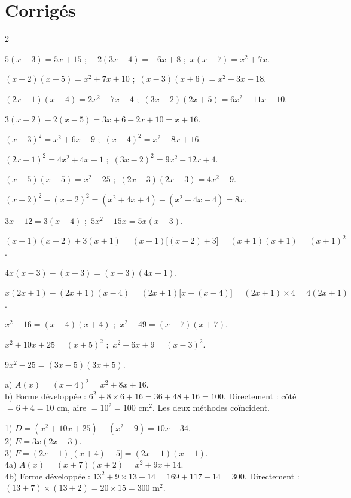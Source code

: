 \section{Corrigés}
\begin{multicols}{2}

$5(x+3)=5x+15$ ;\ $-2(3x-4)=-6x+8$ ;\ $x(x+7)=x^{2}+7x$.

$(x+2)(x+5)=x^{2}+7x+10$ ;\ $(x-3)(x+6)=x^{2}+3x-18$.

$(2x+1)(x-4)=2x^{2}-7x-4$ ;\ $(3x-2)(2x+5)=6x^{2}+11x-10$.

$3(x+2)-2(x-5)=3x+6-2x+10=x+16$.

$(x+3)^{2}=x^{2}+6x+9$ ;\ $(x-4)^{2}=x^{2}-8x+16$.

$(2x+1)^{2}=4x^{2}+4x+1$ ;\ $(3x-2)^{2}=9x^{2}-12x+4$.

$(x-5)(x+5)=x^{2}-25$ ;\ $(2x-3)(2x+3)=4x^{2}-9$.

$(x+2)^{2}-(x-2)^{2}=(x^{2}+4x+4)-(x^{2}-4x+4)=8x$.

$3x+12=3(x+4)$ ;\ $5x^{2}-15x=5x(x-3)$.

$(x+1)(x-2)+3(x+1)=(x+1)\big[(x-2)+3\big]=(x+1)(x+1)=(x+1)^{2}$.

$4x(x-3)-(x-3)=(x-3)(4x-1)$.

$x(2x+1)-(2x+1)(x-4)=(2x+1)\big[x-(x-4)\big]=(2x+1)\times4=4(2x+1)$.

$x^{2}-16=(x-4)(x+4)$ ;\ $x^{2}-49=(x-7)(x+7)$.

$x^{2}+10x+25=(x+5)^{2}$ ;\ $x^{2}-6x+9=(x-3)^{2}$.

$9x^{2}-25=(3x-5)(3x+5)$.

a) $A(x)=(x+4)^{2}=x^{2}+8x+16$.\\
b) Forme développée : $6^{2}+8\times6+16=36+48+16=100$. Directement : côté
$=6+4=10$ cm, aire $=10^{2}=100\text{ cm}^{2}$. Les deux méthodes coïncident.

1) $D=(x^{2}+10x+25)-(x^{2}-9)=10x+34$.\\
2) $E=3x(2x-3)$.\\
3) $F=(2x-1)\big[(x+4)-5\big]=(2x-1)(x-1)$.\\
4a) $A(x)=(x+7)(x+2)=x^{2}+9x+14$.\\
4b) Forme développée : $13^{2}+9\times13+14=169+117+14=300$. Directement :
$(13+7)\times(13+2)=20\times15=300\text{ m}^{2}$.


\end{multicols}

